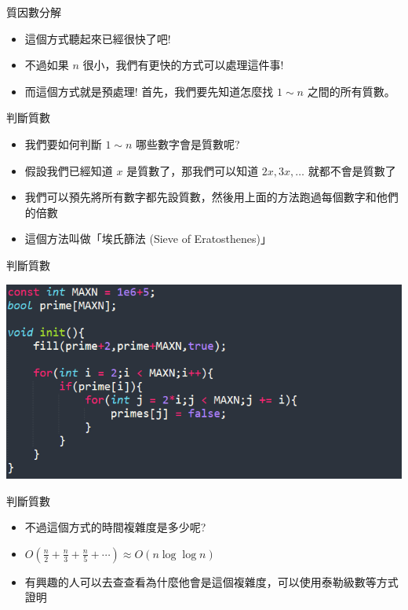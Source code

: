 \documentclass[aspectratio=169]{beamer}
\begin{document}
\begin{frame}{質因數分解}
    \begin{itemize}
        \item<1-> 這個方式聽起來已經很快了吧! 
        \item<1-> 不過如果 $n$ 很小，我們有更快的方式可以處理這件事!
        \item<2-> 而這個方式就是預處理! 首先，我們要先知道怎麼找 $1 \sim n$ 之間的所有質數。
    \end{itemize} 
\end{frame}

\begin{frame}{判斷質數}
    \begin{itemize}
        \item<1-> 我們要如何判斷 $1 \sim n$ 哪些數字會是質數呢?
        \item<2-> 假設我們已經知道 $x$ 是質數了，那我們可以知道 $2x, 3x, \ldots$ 就都不會是質數了
        \item<3-> 我們可以預先將所有數字都先設質數，然後用上面的方法跑過每個數字和他們的倍數
        \item<4-> 這個方法叫做「埃氏篩法 (Sieve of Eratosthenes)」
    \end{itemize}
\end{frame}

\begin{frame}[fragile]{判斷質數}
    \begin{center}
        \includegraphics[scale=0.75]{images/code4.png}
    \end{center}
\end{frame}

\begin{frame}[fragile]{判斷質數}
    \begin{itemize}
        \item<1-> 不過這個方式的時間複雜度是多少呢?
        \item<1-> $\displaystyle O(\frac{n}{2} + \frac{n}{3} + \frac{n}{5} + \cdots) \approx O(n \log \log n)$
        \item<2-> 有興趣的人可以去查查看為什麼他會是這個複雜度，可以使用泰勒級數等方式證明
    \end{itemize}
\end{frame}
\end{document}
